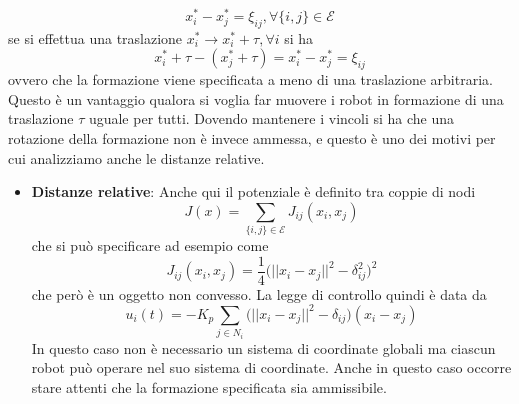 \begin{itemize}
\begin{equation}
x_i^* - x_j^* = \xi_{ij}, \forall \{i,j\} \in \mathcal{E}
\end{equation} se si effettua una traslazione $x_i^* \to x_i^* + \tau, \forall i$ si ha
\begin{equation}
x_i^* + \tau - (x_j^* + \tau) = x_i^* - x_j^* = \xi_{ij}
\end{equation} ovvero che la formazione viene specificata a meno di una traslazione arbitraria. Questo \`e un vantaggio qualora si voglia far muovere i robot in formazione di una traslazione $\tau$ uguale per tutti.
Dovendo mantenere i vincoli si ha che una rotazione della formazione non \`e invece ammessa, e questo \`e uno dei motivi per cui analizziamo anche le distanze relative.
\end{itemize}
\begin{itemize}
\item \textbf{Distanze relative}: Anche qui il potenziale \`e definito tra coppie di nodi
\begin{equation}
J(x) = \sum_{\{i,j\} \in \mathcal{E}} J_{ij} (x_i, x_j)
\end{equation} che si pu\`o specificare ad esempio come
\begin{equation}
J_{ij} (x_i, x_j) = \frac{1}{4} \Big ( ||x_i - x_j||^2 - \delta_{ij}^2 \Big)^2
\end{equation} che per\`o \`e un oggetto non convesso. La legge di controllo quindi \`e data da
\begin{equation}
u_i(t) = -K_p \sum_{j \in N_i} \Big ( ||x_i -x_j||^2 - \delta_{ij} \Big )(x_i - x_j)
\end{equation} In questo caso non \`e necessario un sistema di coordinate globali ma ciascun robot pu\`o operare nel suo sistema di coordinate. Anche in questo caso occorre stare attenti che la formazione specificata sia ammissibile.
\begin{center}
\end{center}
\end{itemize}
